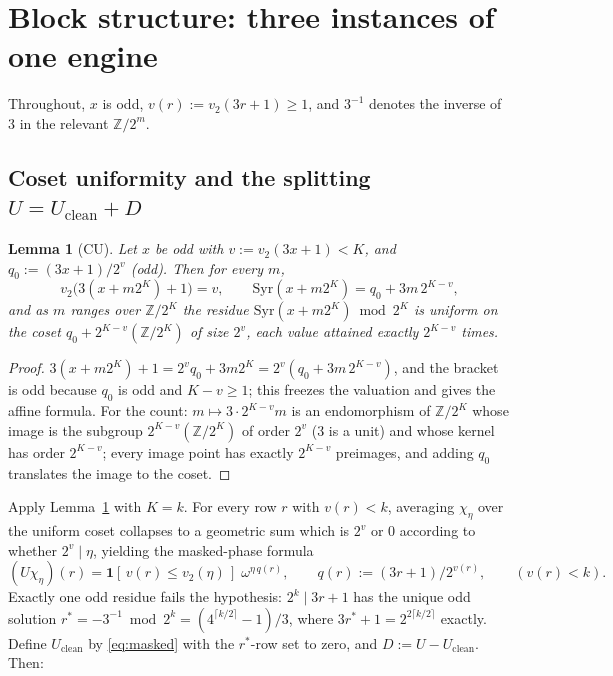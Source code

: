 \documentclass[12pt,a4paper]{article}
\newtheorem{lemma}[theorem]{Lemma}
\newcommand{\Z}{\mathbb{Z}}
\newcommand{\Syr}{\mathrm{Syr}}
\newcommand{\vtwo}{v_2}
\begin{document}
\section{Block structure: three instances of one engine}\label{sec:blocks}

Throughout, $x$ is odd, $v(r) := \vtwo(3r+1) \ge 1$, and $3^{-1}$ denotes the inverse of 3 in the
relevant $\Z/2^m$.

\subsection{Coset uniformity and the splitting \texorpdfstring{$U = U_{\mathrm{clean}} + D$}{U = Uclean + D}}

\begin{lemma}[CU]\label{lem:CU}
Let $x$ be odd with $v := \vtwo(3x+1) < K$, and $q_0 := (3x+1)/2^v$ (odd). Then for every $m$,
\[
  \vtwo\bigl(3(x + m 2^K) + 1\bigr) = v, \qquad
  \Syr(x + m 2^K) = q_0 + 3m\,2^{K-v},
\]
and as $m$ ranges over $\Z/2^K$ the residue $\Syr(x + m 2^K) \bmod 2^K$ is uniform on the coset
$q_0 + 2^{K-v}(\Z/2^K)$ of size $2^v$, each value attained exactly $2^{K-v}$ times.
\end{lemma}

\begin{proof}
$3(x + m2^K) + 1 = 2^v q_0 + 3m 2^K = 2^v (q_0 + 3m\,2^{K-v})$, and the bracket is odd because
$q_0$ is odd and $K - v \ge 1$; this freezes the valuation and gives the affine formula. For the
count: $m \mapsto 3 \cdot 2^{K-v} m$ is an endomorphism of $\Z/2^K$ whose image is the subgroup
$2^{K-v}(\Z/2^K)$ of order $2^v$ (3 is a unit) and whose kernel has order $2^{K-v}$; every image
point has exactly $2^{K-v}$ preimages, and adding $q_0$ translates the image to the coset.
\end{proof}

Apply Lemma~\ref{lem:CU} with $K = k$. For every row $r$ with $v(r) < k$, averaging
$\chi_\eta$ over the uniform coset collapses to a geometric sum which is $2^v$ or $0$ according
to whether $2^v \mid \eta$, yielding the masked-phase formula
\begin{equation}\label{eq:masked}
  (U \chi_\eta)(r) = \mathbf{1}[\,v(r) \le \vtwo(\eta)\,]\; \omega^{\eta\, q(r)}, \qquad
  q(r) := (3r+1)/2^{v(r)}, \qquad (v(r) < k).
\end{equation}
Exactly one odd residue fails the hypothesis: $2^k \mid 3r+1$ has the unique odd solution
$r^\ast = -3^{-1} \bmod 2^k = (4^{\lceil k/2 \rceil} - 1)/3$, where $3r^\ast + 1 =
2^{2\lceil k/2 \rceil}$ exactly. Define $U_{\mathrm{clean}}$ by \eqref{eq:masked} with the
$r^\ast$-row set to zero, and $D := U - U_{\mathrm{clean}}$. Then:
\end{document}

